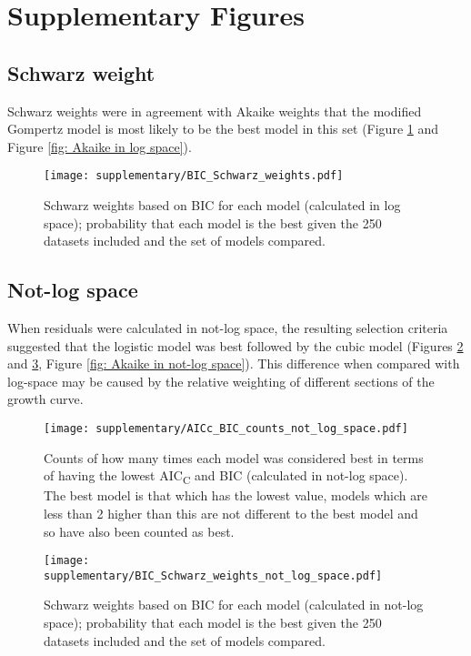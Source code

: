 
\section{Supplementary Figures}
     
    \setcounter{figure}{0}  %
    \makeatletter  %
    \renewcommand{\thefigure}{S\@arabic\c@figure}
    \makeatother

    \subsection{Schwarz weight}
    
        Schwarz weights were in agreement with Akaike weights that the modified Gompertz model is most likely to be the best model in this set (Figure \ref{Sfig: Schwarz in log space} and Figure \ref{fig: Akaike in log space}).

        \begin{figure}[ht!]
            \centering
            \texttt{[image: supplementary/BIC\_Schwarz\_weights.pdf]}
            \caption{Schwarz weights based on BIC for each model (calculated in log space); probability that each model is the best given the 250 datasets included and the set of models compared.}
            \label{Sfig: Schwarz in log space}
        \end{figure}

    \subsection{Not-log space}
    
        When residuals were calculated in not-log space, the resulting selection criteria suggested that the logistic model was best followed by the cubic model (Figures \ref{Sfig: counts in not-log space} and \ref{Sfig: Schwarz in not-log space}, Figure \ref{fig: Akaike in not-log space}). This difference when compared with log-space may be caused by the relative weighting of different sections of the growth curve.
    
        \begin{figure}[ht!]
            \centering
            \texttt{[image: supplementary/AICc\_BIC\_counts\_not\_log\_space.pdf]}
            \caption{Counts of how many times each model was considered best in terms of having the lowest AIC\textsubscript{C} and BIC (calculated in not-log space). The best model is that which has the lowest value, models which are less than 2 higher than this are not different to the best model and so have also been counted as best.}
            \label{Sfig: counts in not-log space}
        \end{figure}
        
        \begin{figure}[ht!]
            \centering
            \texttt{[image: supplementary/BIC\_Schwarz\_weights\_not\_log\_space.pdf]}
            \caption{Schwarz weights based on BIC for each model (calculated in not-log space); probability that each model is the best given the 250 datasets included and the set of models compared.}
            \label{Sfig: Schwarz in not-log space}
        \end{figure}
